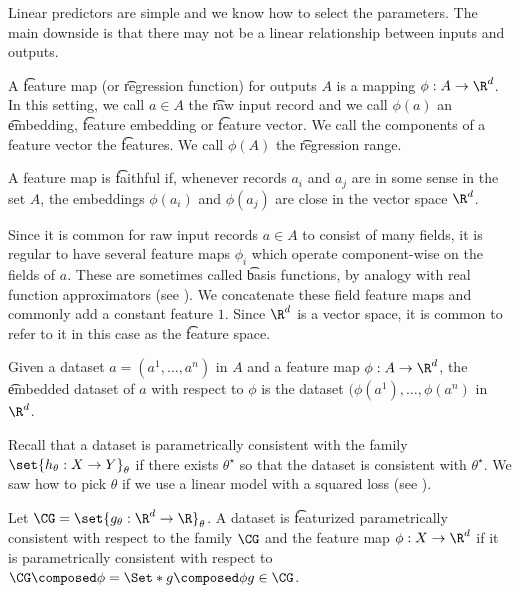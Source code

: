 

Linear predictors are simple and we know how to select the parameters.
The main downside is that there may not be a linear relationship between inputs and outputs.


A \t{feature map} (or \t{regression function}) for outputs $A$ is a mapping $\phi: A \to \R^d$.
In this setting, we call $a \in A$ the \t{raw input record} and we call $\phi(a)$ an \t{embedding}, \t{feature embedding} or \t{feature vector}.
We call the components of a feature vector the \t{features}.
We call $\phi(A)$ the \t{regression range}.

A feature map is \t{faithful} if, whenever records $a_i$ and $a_j$ are in some sense  in the set $A$, the embeddings $\phi(a_i)$ and $\phi(a_j)$ are close in the vector space $\R^d$.

Since it is common for raw input records $a \in A$ to consist of many fields, it is regular to have several feature maps $\phi_i$ which operate component-wise on the fields of $a$.
These are sometimes called \t{basis functions}, by analogy with real function approximators (see ).
We concatenate these field feature maps and commonly add a constant feature $1$.
Since $\R^d$ is a vector space, it is common to refer to it in this case as the \t{feature space}.

Given a dataset $a = (a^1, \dots, a^n)$ in $A$ and a feature map $\phi: A \to \R^d$, the \t{embedded dataset} of $a$ with respect to $\phi$ is the dataset $(\phi(a^1), \dots, \phi(a^n)$ in $\R^d$.


Recall that a dataset is parametrically consistent with the family $\set{h_{\theta}: X \to Y}_{\theta}$ if there exists $\theta^\star$ so that the dataset is consistent with $\theta^{\star}$.
We saw how to pick $\theta$ if we use a linear model with a squared loss (see ).

Let $\CG = \set{g_{\theta}: \R^d \to \R}_{\theta}$.
A dataset is \t{featurized parametrically consistent} with respect to the family $\CG$ and the feature map $\phi: X \to \R^d$ if it is parametrically consistent with respect to $\CG \composed \phi = \Set*{g \composed \phi}{g \in \CG}$.


